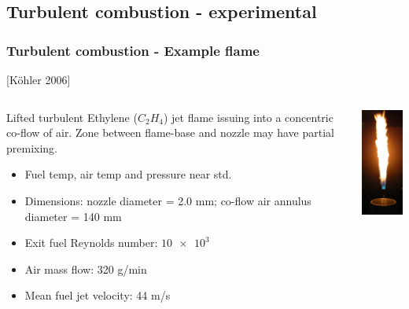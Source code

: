 \documentclass{beamer}
\begin{document}
\subsection[experimental]{Turbulent combustion - experimental}
\begin{frame}%
\frametitle{Turbulent combustion - Example flame}
\scriptsize
[K{\"o}hler 2006] \cite{Kohler, AdelaideISF}
\begin{minipage}[0.5\textheight]{\textwidth}
\begin{columns}[T]
\begin{column}{0.65\textwidth}
\vspace{10pt}

\tiny{Lifted turbulent Ethylene ($C_2H_4$) jet flame issuing into a concentric co-flow of air.
Zone between flame-base and nozzle may have partial premixing.  }
\begin{itemize}%
\tiny
\item Fuel temp, air temp and pressure near std.
\item Dimensions: nozzle diameter = 2.0 mm; co-flow air annulus diameter = 140 mm\\
\item Exit fuel Reynolds number: $\num{10e3}$
\item Air mass flow: 320 g/min 
\item Mean fuel jet velocity: 44 m/s 
\end{itemize}
\end{column}
\begin{column}{0.3\textwidth}
\vspace{0pt}
\includegraphics[height=1\textwidth]{./figs/dlrflame.png}
\end{column}
\end{columns}
\end{minipage}


\end{frame}
\end{document}
